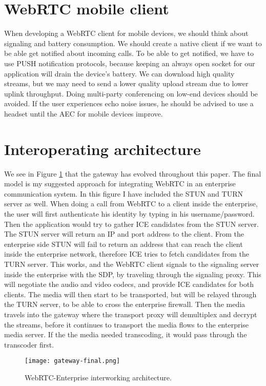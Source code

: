 \section{WebRTC mobile client}
When developing a WebRTC client for mobile devices, we should think about signaling and battery consumption. We should create a native client if we want to be able get notified about incoming calls. To be able to get notified, we have to use PUSH notification protocols, because keeping an always open socket for our application will drain the device's battery. We can download high quality streams, but we may need to send a lower quality upload stream due to lower uplink throughput. Doing multi-party conferencing on low-end devices should be avoided. If the user experiences echo noise issues, he should be advised to use a headset until the AEC for mobile devices improve.

\section{Interoperating architecture}

We see in Figure \ref{fig:gateway-final} that the gateway has evolved throughout this paper. The final model is my suggested approach for integrating WebRTC in an enterprise communication system. In this figure I have included the STUN and TURN server as well. When doing a call from WebRTC to a client inside the enterprise, the user will first authenticate his identity by typing in his username/password. Then the application would try to gather ICE candidates from the STUN server. The STUN server will return an IP and port address to the client. From the enterprise side STUN will fail to return an address that can reach the client inside the enterprise network, therefore ICE tries to fetch candidates from the TURN server. This works, and the WebRTC client signals to the signaling server inside the enterprise with the SDP, by traveling through the signaling proxy. This will negotiate the audio and video codecs, and provide ICE candidates for both clients. The media will then start to be transported, but will be relayed through the TURN server, to be able to cross the enterprise firewall. Then the media travels into the gateway where the transport proxy will demultiplex and decrypt the streams, before it continues to transport the media flows to the enterprise media server. If the the media needed transcoding, it would pass through the transcoder first.
\\
\begin{figure}[here]
\centerline{\texttt{[image: gateway-final.png]}}
\caption{WebRTC-Enterprise interworking architecture.}
\label{fig:gateway-final}
\end{figure}


